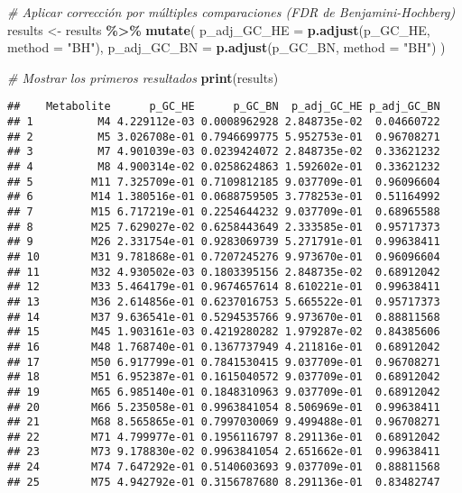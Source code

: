 \documentclass[
]{article}
\newenvironment{Shaded}{\begin{snugshade}}{\end{snugshade}}
\newcommand{\AttributeTok}[1]{\textcolor[rgb]{0.13,0.29,0.53}{#1}}
\newcommand{\CommentTok}[1]{\textcolor[rgb]{0.56,0.35,0.01}{\textit{#1}}}
\newcommand{\FunctionTok}[1]{\textcolor[rgb]{0.13,0.29,0.53}{\textbf{#1}}}
\newcommand{\NormalTok}[1]{#1}
\newcommand{\OtherTok}[1]{\textcolor[rgb]{0.56,0.35,0.01}{#1}}
\newcommand{\SpecialCharTok}[1]{\textcolor[rgb]{0.81,0.36,0.00}{\textbf{#1}}}
\newcommand{\StringTok}[1]{\textcolor[rgb]{0.31,0.60,0.02}{#1}}
\begin{document}
\begin{Shaded}
\begin{Highlighting}[]
\CommentTok{\# Aplicar corrección por múltiples comparaciones (FDR de Benjamini{-}Hochberg)}
\NormalTok{results }\OtherTok{\textless{}{-}}\NormalTok{ results }\SpecialCharTok{\%\textgreater{}\%}
  \FunctionTok{mutate}\NormalTok{(}
    \AttributeTok{p\_adj\_GC\_HE =} \FunctionTok{p.adjust}\NormalTok{(p\_GC\_HE, }\AttributeTok{method =} \StringTok{"BH"}\NormalTok{),}
    \AttributeTok{p\_adj\_GC\_BN =} \FunctionTok{p.adjust}\NormalTok{(p\_GC\_BN, }\AttributeTok{method =} \StringTok{"BH"}\NormalTok{)}
\NormalTok{  )}

\CommentTok{\# Mostrar los primeros resultados}
\FunctionTok{print}\NormalTok{(results)}
\end{Highlighting}
\end{Shaded}

\begin{verbatim}
##    Metabolite      p_GC_HE      p_GC_BN  p_adj_GC_HE p_adj_GC_BN
## 1          M4 4.229112e-03 0.0008962928 2.848735e-02  0.04660722
## 2          M5 3.026708e-01 0.7946699775 5.952753e-01  0.96708271
## 3          M7 4.901039e-03 0.0239424072 2.848735e-02  0.33621232
## 4          M8 4.900314e-02 0.0258624863 1.592602e-01  0.33621232
## 5         M11 7.325709e-01 0.7109812185 9.037709e-01  0.96096604
## 6         M14 1.380516e-01 0.0688759505 3.778253e-01  0.51164992
## 7         M15 6.717219e-01 0.2254644232 9.037709e-01  0.68965588
## 8         M25 7.629027e-02 0.6258443649 2.333585e-01  0.95717373
## 9         M26 2.331754e-01 0.9283069739 5.271791e-01  0.99638411
## 10        M31 9.781868e-01 0.7207245276 9.973670e-01  0.96096604
## 11        M32 4.930502e-03 0.1803395156 2.848735e-02  0.68912042
## 12        M33 5.464179e-01 0.9674657614 8.610221e-01  0.99638411
## 13        M36 2.614856e-01 0.6237016753 5.665522e-01  0.95717373
## 14        M37 9.636541e-01 0.5294535766 9.973670e-01  0.88811568
## 15        M45 1.903161e-03 0.4219280282 1.979287e-02  0.84385606
## 16        M48 1.768740e-01 0.1367737949 4.211816e-01  0.68912042
## 17        M50 6.917799e-01 0.7841530415 9.037709e-01  0.96708271
## 18        M51 6.952387e-01 0.1615040572 9.037709e-01  0.68912042
## 19        M65 6.985140e-01 0.1848310963 9.037709e-01  0.68912042
## 20        M66 5.235058e-01 0.9963841054 8.506969e-01  0.99638411
## 21        M68 8.565865e-01 0.7997030069 9.499488e-01  0.96708271
## 22        M71 4.799977e-01 0.1956116797 8.291136e-01  0.68912042
## 23        M73 9.178830e-02 0.9963841054 2.651662e-01  0.99638411
## 24        M74 7.647292e-01 0.5140603693 9.037709e-01  0.88811568
## 25        M75 4.942792e-01 0.3156787680 8.291136e-01  0.83482747

\end{verbatim}
\end{document}
